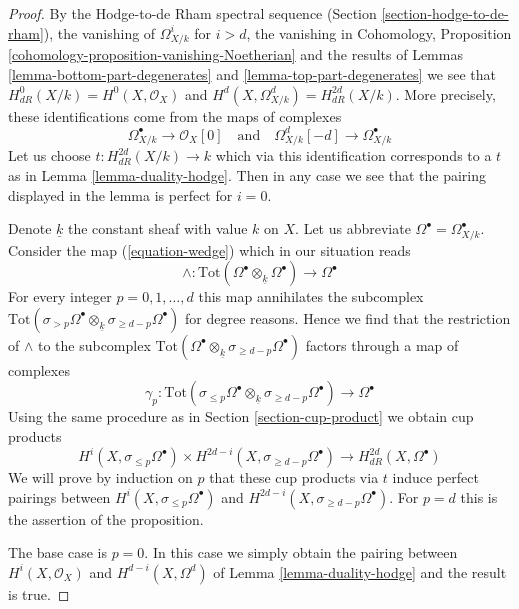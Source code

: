 \begin{proof}
By the Hodge-to-de Rham spectral sequence
(Section \ref{section-hodge-to-de-rham}), the vanishing
of $\Omega^i_{X/k}$ for $i > d$, the vanishing in
Cohomology, Proposition \ref{cohomology-proposition-vanishing-Noetherian}
and the results of Lemmas \ref{lemma-bottom-part-degenerates} and
\ref{lemma-top-part-degenerates}
we see that $H^0_{dR}(X/k) = H^0(X, \mathcal{O}_X)$
and $H^d(X, \Omega^d_{X/k}) = H_{dR}^{2d}(X/k)$.
More precisely, these identifications come from the maps
of complexes
$$
\Omega^\bullet_{X/k} \to \mathcal{O}_X[0]
\quad\text{and}\quad
\Omega^d_{X/k}[-d] \to \Omega^\bullet_{X/k}
$$
Let us choose $t : H_{dR}^{2d}(X/k) \to k$ which via this identification
corresponds to a $t$ as in Lemma \ref{lemma-duality-hodge}.
Then in any case we see that the pairing displayed in the lemma
is perfect for $i = 0$.

\medskip\noindent
Denote $\underline{k}$ the constant sheaf with value $k$ on $X$.
Let us abbreviate $\Omega^\bullet = \Omega^\bullet_{X/k}$.
Consider the map (\ref{equation-wedge}) which in our situation reads
$$
\wedge :
\text{Tot}(\Omega^\bullet \otimes_{\underline{k}} \Omega^\bullet)
\longrightarrow
\Omega^\bullet
$$
For every integer $p = 0, 1, \ldots, d$ this map
annihilates the subcomplex
$\text{Tot}(\sigma_{> p} \Omega^\bullet \otimes_{\underline{k}}
\sigma_{\geq d - p} \Omega^\bullet)$ for degree reasons.
Hence we find that the restriction of $\wedge$ to the subcomplex
$\text{Tot}(\Omega^\bullet \otimes_{\underline{k}}
\sigma_{\geq d - p}\Omega^\bullet)$ factors through a map of complexes
$$
\gamma_p :
\text{Tot}(\sigma_{\leq p} \Omega^\bullet \otimes_{\underline{k}}
\sigma_{\geq d - p} \Omega^\bullet)
\longrightarrow
\Omega^\bullet
$$
Using the same procedure as in Section \ref{section-cup-product} we obtain
cup products
$$
H^i(X, \sigma_{\leq p} \Omega^\bullet) \times
H^{2d - i}(X, \sigma_{\geq d - p}\Omega^\bullet)
\longrightarrow
H_{dR}^{2d}(X, \Omega^\bullet)
$$
We will prove by induction on $p$ that these cup products via $t$
induce perfect pairings between $H^i(X, \sigma_{\leq p} \Omega^\bullet)$
and $H^{2d - i}(X, \sigma_{\geq d - p}\Omega^\bullet)$. For $p = d$
this is the assertion of the proposition.

\medskip\noindent
The base case is $p = 0$. In this case we simply obtain the pairing
between $H^i(X, \mathcal{O}_X)$ and $H^{d - i}(X, \Omega^d)$ of
Lemma \ref{lemma-duality-hodge} and the result is true.


\end{proof}
